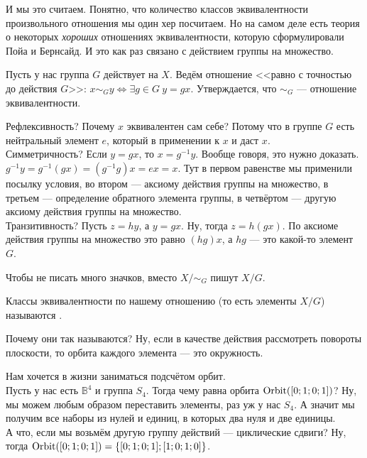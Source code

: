 \documentclass{article}
\begin{document}
\begin{itemize}
\begin{Comment}
            И мы это считаем. Понятно, что количество классов эквивалентности произвольного отношения мы один хер посчитаем. Но на самом деле есть теория о некоторых \textit{хороших} отношениях эквивалентности, которую сформулировали Пойа и Бернсайд. И это как раз связано с действием группы на множество.
        \end{Comment}
        \thm Пусть у нас группа $G$ действует на $X$. Ведём отношение <<равно с точностью до действия $G$>>: $x\sim_Gy\Leftrightarrow \exists g\in G~y=gx$. Утверждается, что $\sim_G$ --- отношение эквивалентности.
        \begin{Proof}
            Рефлексивность? Почему $x$ эквивалентен сам себе? Потому что в группе $G$ есть нейтральный элемент $e$, который в применении к $x$ и даст $x$.\\
            Симметричность? Если $y=gx$, то $x=g^{-1}y$. Вообще говоря, это нужно доказать. $g^{-1}y=g^{-1}(gx)=(g^{-1}g)x=ex=x$. Тут в первом равенстве мы применили посылку условия, во втором --- аксиому действия группы на множество, в третьем --- определение обратного элемента группы, в четвёртом --- другую аксиому действия группы на множество.\\
            Транзитивность? Пусть $z=hy$, а $y=gx$. Ну, тогда $z=h(gx)$. По аксиоме действия группы на множество это равно $(hg)x$, а $hg$ --- это какой-то элемент $G$.
        \end{Proof}
        \begin{Comment}
            Чтобы не писать много значков, вместо $X/\sim_G$ пишут $X/G$.
        \end{Comment}
        \dfn Классы эквивалентности по нашему отношению (то есть элементы $X/G$) называются .
        \begin{Proof}
            Почему они так называются? Ну, если в качестве действия рассмотреть повороты плоскости, то орбита каждого элемента --- это окружность.
        \end{Proof}
        \begin{Example}
            Нам хочется в жизни заниматься подсчётом орбит.\\
            Пусть у нас есть $\mathbb B^4$ и группа $S_4$. Тогда чему равна орбита $\operatorname{Orbit}([0;1;0;1])$? Ну, мы можем любым образом переставить элементы, раз уж у нас $S_4$. А значит мы получим все наборы из нулей и единиц, в которых два нуля и две единицы.\\
            А что, если мы возьмём другую группу действий --- циклические сдвиги? Ну, тогда $\operatorname{Orbit}([0;1;0;1])=\{[0;1;0;1];[1;0;1;0]\}$.

\end{Example}
\end{itemize}
\end{document}

